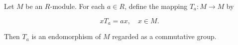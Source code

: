 Let $M$ be an $R$-module. For each $a \in R$, define the mapping $T_a : M \to M$ by

$$x T_a = ax, \quad x \in M.$$

Then $T_a$ is an endomorphism of $M$ regarded as a commutative group.
